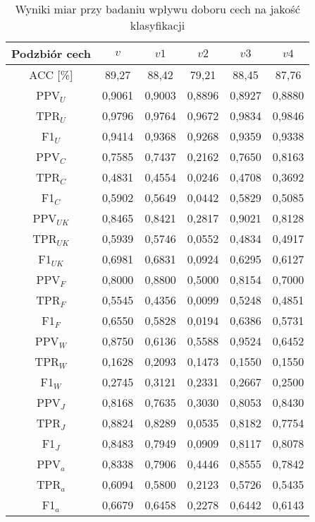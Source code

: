 \documentclass{article}
\begin{document}
\begin{table}[H]
    \centering
    \begin{tabular}{|c|c|c|c|c|c|}
    \hline
    \textbf{Podzbiór cech} & \textbf{\(v\)} & \textbf{\(v1\)} & \textbf{\(v2\)} & \textbf{\(v3\)} & \textbf{\(v4\)}  \\ \hline
    ACC [\%] & 89,27 & 88,42 & 79,21 & 88,45 & 87,76\\ \hline
    PPV\(_U\) & 0,9061 &0,9003& 0,8896 & 0,8927 & 0,8880 \\ \hline
    TPR\(_U\) & 0,9796 &0,9764 & 0,9672 & 0,9834 & 0,9846\\ \hline
    F1\(_U\)  & 0,9414 &0,9368 & 0,9268 & 0,9359 & 0,9338\\ \hline
    PPV\(_C\) & 0,7585 &0,7437 & 0,2162 & 0,7650 & 0,8163\\ \hline
    TPR\(_C\) & 0,4831 &0,4554 & 0,0246 & 0,4708 & 0,3692\\ \hline
    F1\(_C\) & 0,5902 &0,5649 & 0,0442 & 0,5829 & 0,5085\\ \hline
    PPV\(_{UK}\) & 0,8465 &0,8421 & 0,2817 & 0,9021 & 0,8128\\ \hline
    TPR\(_{UK}\) & 0,5939 &0,5746 & 0,0552 & 0,4834 & 0,4917\\ \hline
    F1\(_{UK}\) & 0,6981 &0,6831 & 0,0924 & 0,6295 & 0,6127\\ \hline
    PPV\(_F\) & 0,8000 &0,8800 & 0,5000 & 0,8154 & 0,7000\\ \hline
    TPR\(_F\) & 0,5545 &0,4356 & 0,0099 & 0,5248 & 0,4851\\ \hline
    F1\(_F\) & 0,6550 &0,5828 & 0,0194 & 0,6386 & 0,5731\\ \hline
    PPV\(_W\) & 0,8750 &0,6136 & 0,5588 & 0,9524 & 0,6452\\ \hline
    TPR\(_W\) & 0,1628 &0,2093 & 0,1473 & 0,1550 & 0,1550\\ \hline
    F1\(_W\) & 0,2745 &0,3121 & 0,2331 & 0,2667 & 0,2500\\ \hline
    PPV\(_J\) &  0,8168 &0,7635 & 0,3030 & 0,8053 & 0,8430\\ \hline
    TPR\(_J\) & 0,8824 &0,8289 & 0,0535 & 0,8182 & 0,7754\\ \hline
    F1\(_J\) & 0,8483 & 0,7949 & 0,0909 & 0,8117 & 0,8078\\ \hline
    PPV\(_a\) & 0,8338 & 0,7906 & 0,4446 & 0,8555 & 0,7842 \\ \hline
    TPR\(_a\) &  0,6094 & 0,5800 & 0,2123 & 0,5726 & 0,5435\\ \hline
    F1\(_a\) & 0,6679 & 0,6458 & 0,2278 & 0,6442 & 0,6143\\ \hline
    \end{tabular}
    \caption{Wyniki miar przy badaniu wpływu doboru cech na jakość klasyfikacji}
\end{table}
\end{document}
